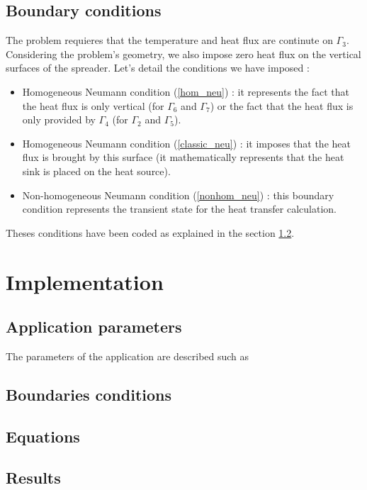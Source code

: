 \subsection{Boundary conditions}
\label{heat:bc}
The problem requieres that the temperature and heat flux are continute on $\Gamma_3$. Considering the problem's geometry, we also impose zero heat flux on the vertical surfaces of the spreader. Let's detail the conditions we have imposed :
\begin{itemize}
\item Homogeneous Neumann condition (\ref{hom_neu}) : it represents the fact that the heat flux is only vertical (for $\Gamma_6$ and $\Gamma_7$) or the fact that the heat flux is only provided by $\Gamma_4$ (for $\Gamma_2$ and $\Gamma_5$).

\item Homogeneous Neumann condition (\ref{classic_neu}) : it imposes that the heat flux is brought by this surface (it mathematically represents that the heat sink is placed on the heat source).

\item Non-homogeneous Neumann condition (\ref{nonhom_neu}) :  this boundary condition represents the transient state for the heat transfer calculation.
\end{itemize}

Theses conditions have been coded as explained in the section \ref{heat:bc_impl}.

\section{Implementation}
\label{heat:impl}

\subsection{Application parameters}
\label{heat:param}

The parameters of the application are described such as 


\subsection{Boundaries conditions}
\label{heat:bc_impl}

\subsection{Equations}
\label{heat:eq_impl}

\subsection{Results}
